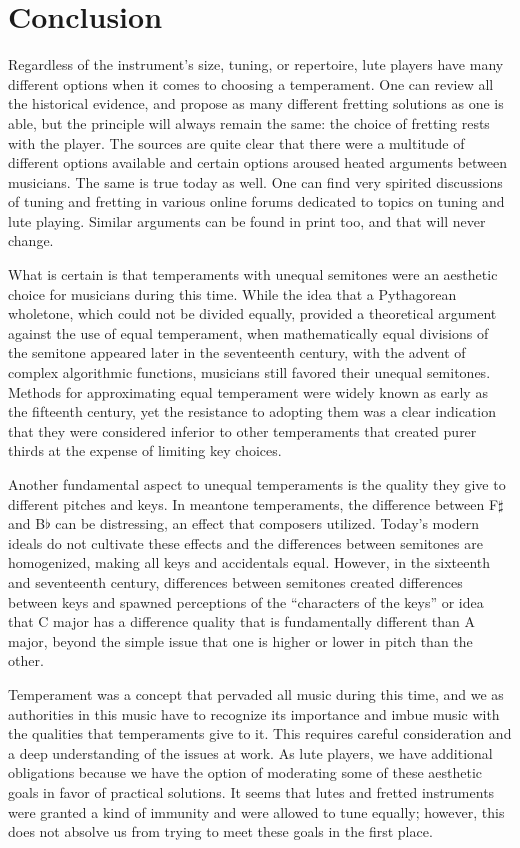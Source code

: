 \section{Conclusion}

Regardless of the instrument's size, tuning, or repertoire, lute players have many different options
when it comes to choosing a temperament.  One can review all the historical evidence, and propose as
many different fretting solutions as one is able, but the principle will always remain the same: the
choice of fretting rests with the player. The sources are quite clear that there were a
multitude of different options available and certain options aroused heated arguments between
musicians. The same is true today as well. One can find very spirited discussions of tuning and
fretting in various online forums dedicated to topics on tuning and lute playing. Similar arguments
can be found in print too, and that will never change. \autocite{DD:4}

What is certain is that temperaments with unequal semitones were an aesthetic choice for musicians
during this time.  While the idea that a Pythagorean wholetone, which could not be divided equally,
provided a theoretical argument against the use of equal temperament, when mathematically equal
divisions of the semitone appeared later in the seventeenth century, with the advent of complex
algorithmic functions, musicians still favored their unequal semitones.  Methods for approximating
equal temperament were widely known as early as the fifteenth century, yet the resistance to
adopting them was a clear indication that they were considered inferior to other temperaments that
created purer thirds at the expense of limiting key choices.

Another fundamental aspect to unequal temperaments is the quality they give to different pitches and
keys.  In meantone temperaments, the difference between F$\sharp$ and B$\flat$ can be distressing,
an effect that composers utilized.  Today's modern ideals do not cultivate these effects and the
differences between semitones are homogenized, making all keys and accidentals equal.  However, in
the sixteenth and seventeenth century, differences between semitones created differences between
keys and spawned perceptions of the ``characters of the keys'' or idea that C major has a difference
quality that is fundamentally different than A major, beyond the simple issue that one is higher or
lower in pitch than the other.

Temperament was a concept that pervaded all music during this time, and we as authorities in this
music have to recognize its importance and imbue music with the qualities that temperaments give to
it.  This requires careful consideration and a deep understanding of the issues at work.  As lute
players, we have additional obligations because we have the option of moderating some of these
aesthetic goals in favor of practical solutions.  It seems that lutes and fretted instruments were
granted a kind of immunity and were allowed to tune equally; however, this does not absolve us from
trying to meet these goals in the first place.

